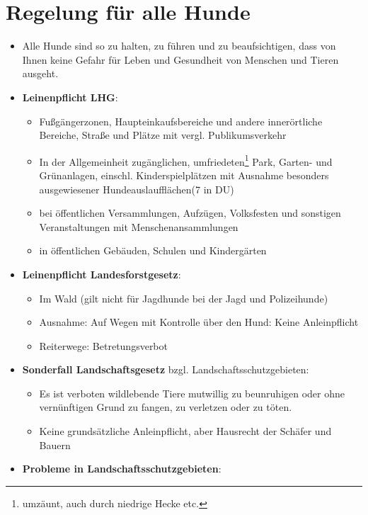 \clearpage
\section{Regelung für alle Hunde}
    \begin{itemize}
        \item Alle Hunde sind so zu halten, zu führen und zu beaufsichtigen, dass von Ihnen keine Gefahr für Leben und Gesundheit von Menschen und Tieren ausgeht.
        \item \textbf{Leinenpflicht LHG}:
        \begin{itemize}
             \item Fußgängerzonen, Haupteinkaufsbereiche und andere innerörtliche Bereiche, Straße und Plätze mit vergl. Publikumsverkehr
             \item In der Allgemeinheit zugänglichen, umfriedeten\footnote{\glqq umzäunt\grqq{}, auch durch niedrige Hecke etc.} Park, Garten- und Grünanlagen, einschl. Kinderspielplätzen mit Ausnahme besonders ausgewiesener Hundeauslaufflächen(7 in DU)
             \item bei öffentlichen Versammlungen, Aufzügen, Volksfesten und sonstigen Veranstaltungen mit Menschenansammlungen
             \item in öffentlichen Gebäuden, Schulen und Kindergärten
         \end{itemize}
         \item \textbf{Leinenpflicht Landesforstgesetz}:
         \begin{itemize}
             \item Im Wald (gilt nicht für Jagdhunde bei der Jagd und Polizeihunde)
             \item Ausnahme: Auf Wegen mit \glqq Kontrolle\grqq{} über den Hund: Keine Anleinpflicht
             \item Reiterwege: Betretungsverbot
         \end{itemize}
         \item \textbf{Sonderfall Landschaftsgesetz} bzgl. Landschaftsschutzgebieten:
         \begin{itemize}
             \item Es ist verboten wildlebende Tiere mutwillig zu beunruhigen oder ohne vernünftigen Grund zu fangen, zu verletzen oder zu töten.
             \item Keine grundsätzliche Anleinpflicht, aber Hausrecht der Schäfer und Bauern
         \end{itemize}
         \item \textbf{Probleme in Landschaftsschutzgebieten}:

\end{itemize}
